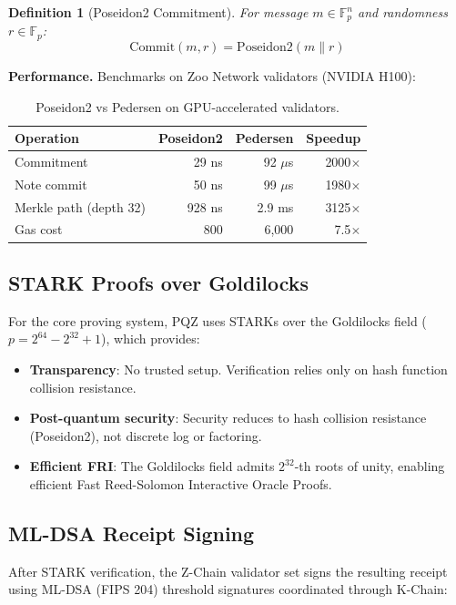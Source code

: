 \documentclass[11pt,a4paper]{article}
\newtheorem{definition}{Definition}
\begin{document}
\begin{definition}[Poseidon2 Commitment]
For message $m \in \mathbb{F}_p^n$ and randomness $r \in \mathbb{F}_p$:
$$\text{Commit}(m, r) = \text{Poseidon2}(m \| r)$$
\end{definition}

\textbf{Performance.} Benchmarks on Zoo Network validators (NVIDIA H100):

\begin{table}[h]
\centering
\begin{tabular}{lrrr}
\toprule
\textbf{Operation} & \textbf{Poseidon2} & \textbf{Pedersen} & \textbf{Speedup} \\
\midrule
Commitment & 29 ns & 92 $\mu$s & 2000$\times$ \\
Note commit & 50 ns & 99 $\mu$s & 1980$\times$ \\
Merkle path (depth 32) & 928 ns & 2.9 ms & 3125$\times$ \\
Gas cost & 800 & 6,000 & 7.5$\times$ \\
\bottomrule
\end{tabular}
\caption{Poseidon2 vs Pedersen on GPU-accelerated validators.}
\end{table}

\subsection{STARK Proofs over Goldilocks}

For the core proving system, PQZ uses STARKs over the Goldilocks field ($p = 2^{64} - 2^{32} + 1$), which provides:

\begin{itemize}
\item \textbf{Transparency}: No trusted setup. Verification relies only on hash function collision resistance.
\item \textbf{Post-quantum security}: Security reduces to hash collision resistance (Poseidon2), not discrete log or factoring.
\item \textbf{Efficient FRI}: The Goldilocks field admits $2^{32}$-th roots of unity, enabling efficient Fast Reed-Solomon Interactive Oracle Proofs.
\end{itemize}

\subsection{ML-DSA Receipt Signing}

After STARK verification, the Z-Chain validator set signs the resulting receipt using ML-DSA (FIPS 204) threshold signatures coordinated through K-Chain:
\end{document}
